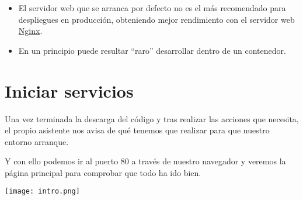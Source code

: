\begin{itemize}
    \item El servidor web que se arranca por defecto no es el más recomendado para despliegues en producción, obteniendo mejor rendimiento con el servidor web \href{https://nginx.org/en/}{Nginx}.

    \item En un principio puede resultar “raro” desarrollar dentro de un contenedor.
\end{itemize}


\section{Iniciar servicios}

Una vez terminada la descarga del código y tras realizar las acciones que necesita, el propio asistente nos avisa de qué tenemos que realizar para que nuestro entorno arranque.


Y con ello podemos ir al puerto 80 a través de nuestro navegador y veremos la página principal para comprobar que todo ha ido bien.

\begin{center}
    \texttt{[image: intro.png]}
\end{center}